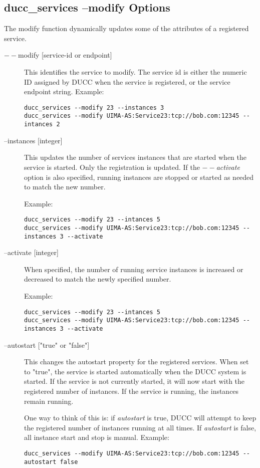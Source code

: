     \subsection{ducc\_services --modify Options}
    The modify function dynamically updates some of the attributes of a registered service. 
    
    \begin{description}
        \item[$--$modify {[service-id or endpoint]}]  This identifies the service to modify. The service id is either
          the numeric ID assigned by DUCC when the service is registered, or the service endpoint
          string.  Example:
\begin{verbatim}
ducc_services --modify 23 --instances 3 
ducc_services --modify UIMA-AS:Service23:tcp://bob.com:12345 --intances 2 
\end{verbatim}

        \item[ --instances {[integer]}] This updates the number of services instances that are
          started when the service is started.  Only the registration is updated. If the {\em $--$activate}
          option is also specified, running instances are stopped or started as needed to match the
          new number.

          Example: 
\begin{verbatim}
ducc_services --modify 23 --intances 5 
ducc_services --modify UIMA-AS:Service23:tcp://bob.com:12345 --instances 3 --activate 
\end{verbatim}

        \item[ --activate {[integer]}] When specified, the number of running service instances is
          increased or decreased to match the newly specified number.

          Example: 
\begin{verbatim}
ducc_services --modify 23 --intances 5 
ducc_services --modify UIMA-AS:Service23:tcp://bob.com:12345 --instances 3 --activate 
\end{verbatim}

        \item[ --autostart {["true" or "false"]}] This changes the autostart property for the
          registered services. When set to "true", the service is started automatically when the
          DUCC system is started.  If the service is not currently started, it will now start
          with the registered number of instances.  If the service is running, the instances
          remain running.

          One way to think of this is: if {\em autostart} is true, DUCC will attempt to keep
          the registered number of instances running at all times.  If {\em autostart} is
          false, all instance start and stop is manual.
          Example: 
\begin{verbatim}
ducc_services --modify UIMA-AS:Service23:tcp://bob.com:12345 --autostart false 
\end{verbatim}
        \end{description}

